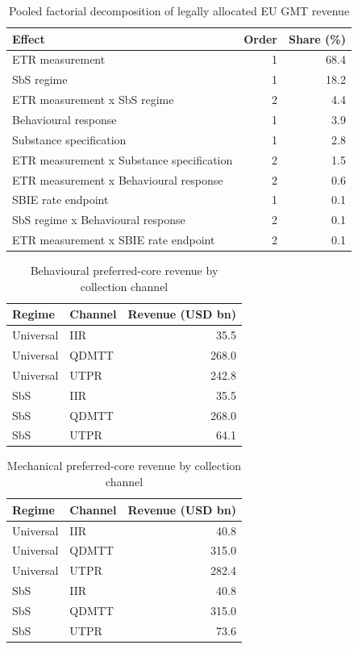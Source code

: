 \begin{table}[H]
\centering
\caption{Pooled factorial decomposition of legally allocated EU GMT revenue}
\label{tab:stage4_6_anova_pooled_generated}
\small
\begin{tabular}{@{}lrr@{}}
\toprule
Effect & Order & Share (\%) \\
\midrule
ETR measurement & 1 & 68.4 \\
SbS regime & 1 & 18.2 \\
ETR measurement x SbS regime & 2 & 4.4 \\
Behavioural response & 1 & 3.9 \\
Substance specification & 1 & 2.8 \\
ETR measurement x Substance specification & 2 & 1.5 \\
ETR measurement x Behavioural response & 2 & 0.6 \\
SBIE rate endpoint & 1 & 0.1 \\
SbS regime x Behavioural response & 2 & 0.1 \\
ETR measurement x SBIE rate endpoint & 2 & 0.1 \\
\bottomrule
\end{tabular}
\end{table}

\begin{table}[H]
\centering
\caption{Behavioural preferred-core revenue by collection channel}
\label{tab:stage4_6_preferred_behavioural_channels_generated}
\small
\begin{tabular}{@{}llr@{}}
\toprule
Regime & Channel & Revenue (USD bn) \\
\midrule
Universal & IIR & 35.5 \\
Universal & QDMTT & 268.0 \\
Universal & UTPR & 242.8 \\
SbS & IIR & 35.5 \\
SbS & QDMTT & 268.0 \\
SbS & UTPR & 64.1 \\
\bottomrule
\end{tabular}
\end{table}

\begin{table}[H]
\centering
\caption{Mechanical preferred-core revenue by collection channel}
\label{tab:stage4_6_preferred_channels_generated}
\small
\begin{tabular}{@{}llr@{}}
\toprule
Regime & Channel & Revenue (USD bn) \\
\midrule
Universal & IIR & 40.8 \\
Universal & QDMTT & 315.0 \\
Universal & UTPR & 282.4 \\
SbS & IIR & 40.8 \\
SbS & QDMTT & 315.0 \\
SbS & UTPR & 73.6 \\
\bottomrule
\end{tabular}
\end{table}

